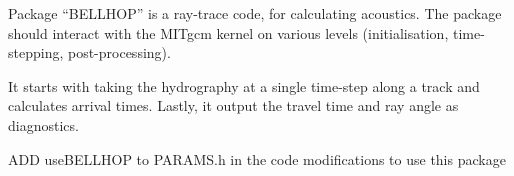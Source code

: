 
Package ``BELLHOP'' is a ray-trace code, for calculating acoustics.
The package should interact with the MITgcm kernel on various levels 
(initialisation, time-stepping, post-processing).

It starts with taking the hydrography at a single time-step along a track and 
calculates arrival times. Lastly, it output the travel time and ray angle as
diagnostics.


ADD useBELLHOP to PARAMS.h in the code modifications to use this package
